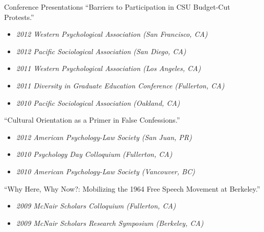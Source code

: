 \begin{rSection}{Conference Presentations}
``Barriers to Participation in CSU Budget-Cut Protests.''
\vspace*{-.75em} 
\begin{itemize}[leftmargin=.25in] 
\item {\footnotesize \it 2012 Western Psychological Association (San Francisco, CA)}\vspace*{-.75em} 
\item {\footnotesize \it 2012 Pacific Sociological Association (San Diego, CA)}\vspace*{-.75em} 
\item {\footnotesize \it 2011 Western Psychological Association (Los Angeles, CA)}\vspace*{-.75em} 
\item {\footnotesize \it 2011 Diversity in Graduate Education Conference (Fullerton, CA)}\vspace*{-.75em} 
\item {\footnotesize \it 2010 Pacific Sociological Association (Oakland, CA)}
\end{itemize} 

``Cultural Orientation as a Primer in False Confessions.''
\vspace*{-.75em} 
\begin{itemize}[leftmargin=.25in] 
\item {\footnotesize \it 2012 American Psychology-Law Society (San Juan, PR)}\vspace*{-.75em} 
\item {\footnotesize \it 2010 Psychology Day Colloquium (Fullerton, CA)}\vspace*{-.75em} 
\item {\footnotesize \it 2010 American Psychology-Law Society (Vancouver, BC)}
\end{itemize} 

``Why Here, Why Now?: Mobilizing the 1964 Free Speech Movement at
Berkeley.''
\vspace*{-.75em} 
\begin{itemize}[leftmargin=.25in] 
\item {\footnotesize \it 2009 McNair Scholars Colloquium (Fullerton, CA)}\vspace*{-.75em} 
\item {\footnotesize \it 2009 McNair Scholars Research Symposium (Berkeley, CA)}
\end{itemize}  

\end{rSection}



